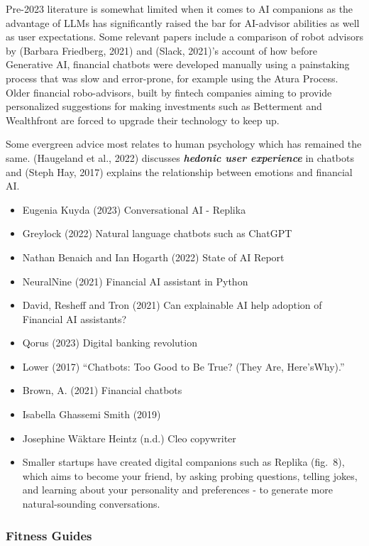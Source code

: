 \documentclass[
  letterpaper,
  DIV=11,
  numbers=noendperiod]{scrartcl}
\begin{document}
Pre-2023 literature is somewhat limited when it comes to AI companions
as the advantage of LLMs has significantly raised the bar for AI-advisor
abilities as well as user expectations. Some relevant papers include a
comparison of robot advisors by (Barbara Friedberg, 2021) and (Slack,
2021)'s account of how before Generative AI, financial chatbots were
developed manually using a painstaking process that was slow and
error-prone, for example using the Atura Process. Older financial
robo-advisors, built by fintech companies aiming to provide personalized
suggestions for making investments such as Betterment and Wealthfront
are forced to upgrade their technology to keep up.

Some evergreen advice most relates to human psychology which has
remained the same. (Haugeland et al., 2022) discusses
\textbf{\emph{hedonic user experience}} in chatbots and (Steph Hay,
2017) explains the relationship between emotions and financial AI.

\begin{itemize}
\item
  Eugenia Kuyda (2023) Conversational AI - Replika
\item
  Greylock (2022) Natural language chatbots such as ChatGPT
\item
  Nathan Benaich and Ian Hogarth (2022) State of AI Report
\item
  NeuralNine (2021) Financial AI assistant in Python
\item
  David, Resheff and Tron (2021) Can explainable AI help adoption of
  Financial AI assistants?
\item
  Qorus (2023) Digital banking revolution
\item
  Lower (2017) ``Chatbots: Too Good to Be True? (They Are, Here'sWhy).''
\item
  Brown, A. (2021) Financial chatbots
\item
  Isabella Ghassemi Smith (2019)
\item
  Josephine Wäktare Heintz (n.d.) Cleo copywriter
\item
  Smaller startups have created digital companions such as Replika
  (fig.~8), which aims to become your friend, by asking probing
  questions, telling jokes, and learning about your personality and
  preferences - to generate more natural-sounding conversations.
\end{itemize}

\subsubsection{Fitness Guides}\label{fitness-guides}
\end{document}
